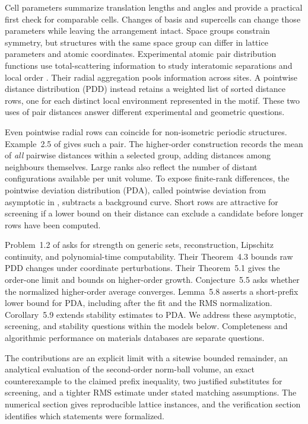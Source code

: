 \documentclass[11pt,a4paper]{article}
\theoremstyle{definition}
\begin{document}
Cell parameters summarize translation lengths and angles and provide a practical first check for comparable cells. Changes of basis and supercells can change those parameters while leaving the arrangement intact. Space groups constrain symmetry, but structures with the same space group can differ in lattice parameters and atomic coordinates. Experimental atomic pair distribution functions use total-scattering information to study interatomic separations and local order \cite{billinge}. Their radial aggregation pools information across sites. A pointwise distance distribution (PDD) instead retains a weighted list of sorted distance rows, one for each distinct local environment represented in the motif. These two uses of pair distances answer different experimental and geometric questions.

Even pointwise radial rows can coincide for non-isometric periodic structures. Example~2.5 of \cite{wkhigher} gives such a pair. The higher-order construction records the mean of \emph{all} pairwise distances within a selected group, adding distances among neighbours themselves. Large ranks also reflect the number of distant configurations available per unit volume. To expose finite-rank differences, the pointwise deviation distribution (PDA), called pointwise deviation from asymptotic in \cite{wkhigher}, subtracts a background curve. Short rows are attractive for screening if a lower bound on their distance can exclude a candidate before longer rows have been computed.

Problem~1.2 of \cite{wkhigher} asks for strength on generic sets, reconstruction, Lipschitz continuity, and polynomial-time computability. Their Theorem~4.3 bounds raw PDD changes under coordinate perturbations. Their Theorem~5.1 gives the order-one limit and bounds on higher-order growth. Conjecture~5.5 asks whether the normalized higher-order average converges. Lemma~5.8 asserts a short-prefix lower bound for PDA, including after the fit and the RMS normalization. Corollary~5.9 extends stability estimates to PDA. We address these asymptotic, screening, and stability questions within the models below. Completeness and algorithmic performance on materials databases are separate questions.

The contributions are an explicit limit with a sitewise bounded remainder, an analytical evaluation of the second-order norm-ball volume, an exact counterexample to the claimed prefix inequality, two justified substitutes for screening, and a tighter RMS estimate under stated matching assumptions. The numerical section gives reproducible lattice instances, and the verification section identifies which statements were formalized.
\end{document}
